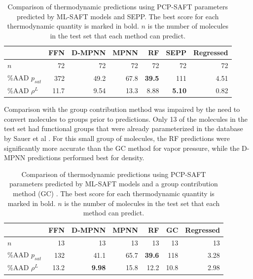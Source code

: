 \begin{table}
	\caption{Comparison of thermodynamic predictions using PCP-SAFT parameters predicted by ML-SAFT models and SEPP.\cite{Kaminski2020} The best score for each thermodynamic quantity is marked in bold. $n$ is the number of molecules in the test set that each method can predict.}
        \label{tab:sepp}
	\begin{center}
        \begin{tabular}{lrrrrr|r}
            & FFN & D-MPNN & MPNN & RF & SEPP & Regressed \\
            \hline
            $n$ & 72 & 72 & 72 & 72 & 72 & 72 \\
            \%AAD $p_{sat}$ & 372 & 49.2 & 67.8 & \textbf{39.5} & 111 & 4.51 \\
            \%AAD $\rho^{L}$ & 11.7 & 9.54 & 13.3 & 8.88 &\textbf{5.10} & 0.82 \\
            \hline
        \end{tabular}
	\end{center}
\end{table}

Comparison with the group contribution method was impaired by the need to convert molecules to groups prior to predictions. Only 13 of the molecules in the test set had functional groups that were already parameterized in the database by Sauer et al \cite{Sauer2014}. For this small group of molecules, the RF predictions were significantly more accurate than the GC method for vapor pressure, while the D-MPNN predictions performed best for density. 


\begin{table}
	\caption{Comparison of thermodynamic predictions using PCP-SAFT parameters predicted by ML-SAFT models and a group contribution method (GC) \cite{Sauer2014}. The best score for each thermodynamic quantity  is marked in bold. $n$ is the number of molecules in the test set that each method can predict.}
    \label{tab:gc}
	\begin{center}
		\begin{tabular}{lrrrrr|r}
			 & FFN & D-MPNN & MPNN & RF & GC & Regressed \\
			\hline
			$n$ & 13 & 13 & 13 & 13 & 13 & 13 \\
			\%AAD $p_{sat}$ & 132 & 41.1 & 65.7 & \textbf{39.6} & 118 & 3.28 \\
			\%AAD $\rho^{L}$ & 13.2 & \textbf{9.98} & 15.8 & 12.2 & 10.8 & 2.98 \\
                \hline
		\end{tabular}
	\end{center}
\end{table}


